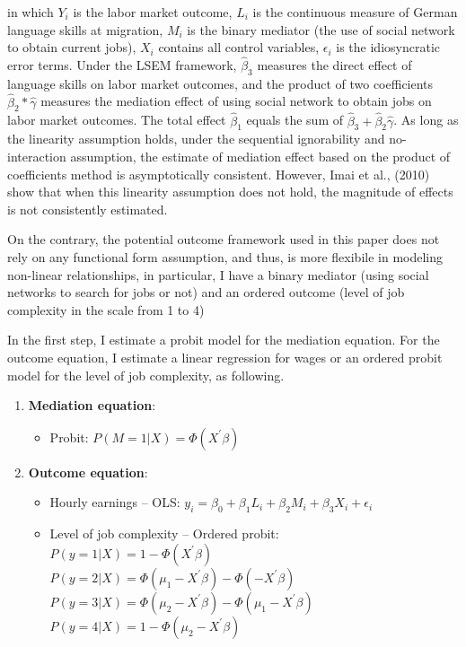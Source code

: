 \documentclass[12pt,a4paper]{article}
\begin{document}
in which $Y_{i}$ is the labor market outcome, $L_{i}$ is the continuous measure of German language skills at migration, $M_{i}$ is the binary mediator (the use of social network to obtain current jobs), $X_{i}$ contains all control variables, $\epsilon_{i}$ is the idiosyncratic error terms. Under the LSEM framework, $\hat \beta_{3}$ measures the direct effect of language skills on labor market outcomes, and the product of two coefficients $\hat \beta_{2}*\hat \gamma$ measures the mediation effect of using social network to obtain jobs on labor market outcomes. The total effect $\hat \beta_{1}$ equals the sum of $\hat \beta_{3} + \hat \beta_{2}\hat \gamma$. As long as the linearity assumption holds, under the sequential ignorability and no-interaction assumption, the estimate of mediation effect based on the product of coefficients method is asymptotically consistent. However, Imai et al., (2010) show that when this linearity assumption does not hold, the magnitude of effects is not consistently estimated. 

On the contrary, the potential outcome framework used in this paper does not rely on any functional form assumption, and thus, is more flexibile in modeling non-linear relationships, in particular, I have a binary mediator (using social networks to search for jobs or not) and an ordered outcome (level of job complexity in the scale from 1 to 4)

In the first step, I estimate a probit model for the mediation equation. For the outcome equation, I estimate a linear regression for wages or an ordered probit model for the level of job complexity, as following.

\begin{enumerate}

\item \textbf{Mediation equation}: 

\begin{itemize}
\item Probit: $P(M = 1|X) = \Phi(X^{'}\beta)$
\end{itemize}

\item \textbf{Outcome equation}:
\begin{itemize}

\item Hourly earnings -- OLS: $y_{i} = \beta_{0} + \beta_{1}L_{i} + \beta_{2}M_{i} + \beta_{3}X_{i} + \epsilon_{i}$ \\

\item Level of job complexity -- Ordered probit: \\

$P(y = 1|X) = 1 - \Phi(X^{'}\beta)$ \\
$P(y = 2|X) = \Phi(\mu_{1} - X^{'}\beta) - \Phi(-X^{'}\beta)$ \\
$P(y = 3|X) = \Phi(\mu_{2} - X^{'}\beta) - \Phi(\mu_{1} - X^{'}\beta)$ \\
$P(y = 4|X) = 1 - \Phi(\mu_{2} - X^{'}\beta)$
\end{itemize}

\end{enumerate}
\end{document}
